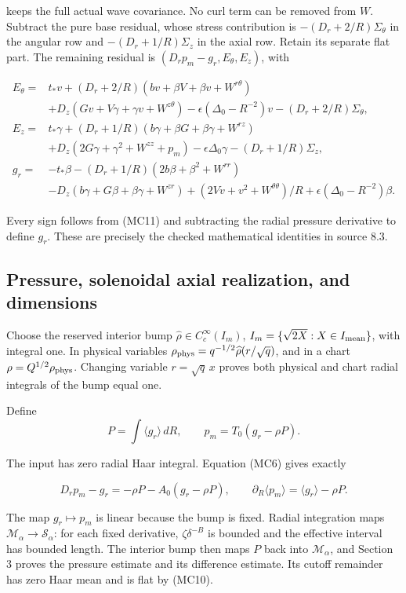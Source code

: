 \documentclass[10pt,a4paper]{article}
\begin{document}
keeps the full actual wave covariance. No curl term can be removed from \(W\). Subtract the pure base residual, whose stress contribution is \(-(D_r+2/R)\Sigma_\theta\) in the angular row and \(-(D_r+1/R)\Sigma_z\) in the axial row. Retain its separate flat part. The remaining residual is \((D_rp_m-g_r,E_\theta,E_z)\), with

\[
\begin{aligned}
E_\theta={}&t_*v+(D_r+2/R)(bv+\beta V+\beta v+W^{r\theta})\\
&+D_z(Gv+V\gamma+\gamma v+W^{z\theta})
-\epsilon(\Delta_0-R^{-2})v-(D_r+2/R)\Sigma_\theta,\\
E_z={}&t_*\gamma+(D_r+1/R)(b\gamma+\beta G+\beta\gamma+W^{rz})\\
&+D_z(2G\gamma+\gamma^2+W^{zz}+p_m)
-\epsilon\Delta_0\gamma-(D_r+1/R)\Sigma_z,\\
g_r={}&-t_*\beta-(D_r+1/R)(2b\beta+\beta^2+W^{rr})\\
&-D_z(b\gamma+G\beta+\beta\gamma+W^{zr})
+(2Vv+v^2+W^{\theta\theta})/R
+\epsilon(\Delta_0-R^{-2})\beta.
\end{aligned}
\tag{MC12}
\]

Every sign follows from (MC11) and subtracting the radial pressure derivative to define \(g_r\). These are precisely the checked mathematical identities in source \(8.3\).

\subsection{Pressure, solenoidal axial realization, and dimensions}

Choose the reserved interior bump \(\widehat\rho\in C_c^\infty(I_m)\), \(I_m=\{\sqrt{2X}:X\in I_{\rm mean}\}\), with integral one. In physical variables \(\rho_{\rm phys}=q^{-1/2}\widehat\rho(r/\sqrt q)\), and in a chart \(\rho=Q^{1/2}\rho_{\rm phys}\). Changing variable \(r=\sqrt q\,x\) proves both physical and chart radial integrals of the bump equal one.

Define
\[
P=\int\langle g_r\rangle\,dR,\qquad p_m=T_0(g_r-\rho P).
\]

The input has zero radial Haar integral. Equation (MC6) gives exactly

\[
D_rp_m-g_r=-\rho P-A_0(g_r-\rho P),
\qquad
\partial_R\langle p_m\rangle=\langle g_r\rangle-\rho P.
\tag{MC13}
\]

The map \(g_r\mapsto p_m\) is linear because the bump is fixed. Radial integration maps \(\mathcal M_\alpha\to\mathcal S_\alpha\): for each fixed derivative, \(\zeta\delta^{-B}\) is bounded and the effective interval has bounded length. The interior bump then maps \(P\) back into \(\mathcal M_\alpha\), and Section 3 proves the pressure estimate and its difference estimate. Its cutoff remainder has zero Haar mean and is flat by (MC10).
\end{document}
